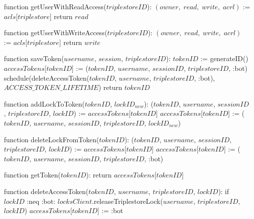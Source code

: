 function getUserWithReadAccess($triplestoreID$):
    $(owner, \; read, \; write, \; acrl)$ := $acls$[$triplestore$]
    return $read$

function getUserWithWriteAccess($triplestoreID$):
    $(owner, \; read, \; write, \; acrl)$ := $acls$[$triplestore$]
    return $write$ 

function saveToken($username$, $session$, $triplestoreID$):
    $tokenID$ := generateID()
    $accessTokens$[$tokenID$] := ($tokenID$, $username$, $sessionID$, $triplestoreID$, :bot)
    schedule(deleteAccessToken($tokenID$, $username$, $triplestoreID$, :bot), $ACCESS\_TOKEN\_LIFETIME$)
    return $tokenID$

function addLockToToken($tokenID$, $lockID_{new}$): 
    ($tokenID$, $username$, $sessionID$, $triplestoreID$, $lockID$) := $accessTokens$[$tokenID$]
    $accessTokens$[$tokenID$] := ($tokenID$, $username$, $sessionID$, $triplestoreID$, $lockID_{new}$)

function deleteLockFromToken($tokenID$):
    ($tokenID$, $username$, $sessionID$, $triplestoreID$, $lockID$) := $accessTokens$[$tokenID$]
    $accessTokens$[$tokenID$] := ($tokenID$, $username$, $sessionID$, $triplestoreID$, :bot)

function getToken($tokenID$): 
    return $accessTokens$[$tokenID$]

function deleteAccessToken($tokenID$, $username$, $triplestoreID$, $lockID$):
    if $lockID$ :neq :bot:
        $locksClient$.releaseTriplestoreLock($username$, $triplestoreID$, $lockID$)
    $accessTokens$[$tokenID$] := :bot